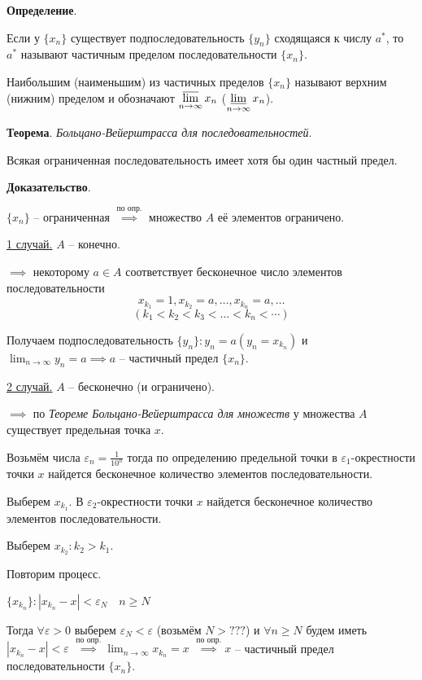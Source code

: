 \documentclass{article}
\newcommand{\bydef}{\stackrel{\text{по опр.}}{\implies}} %
\newcommand{\parspace}{\vspace{10pt}}
\begin{document}
\pagebreak

\textbf{Определение}.

Если у $\{x_n\}$ существует подпоследовательность $\{y_n\}$ сходящаяся к числу $a^*$,
то $a^*$ называют частичным пределом последовательности $\{x_n\}$.

Наибольшим (наименьшим) из частичных пределов $\{x_n\}$ называют верхним (нижним) пределом
и обозначают $\displaystyle\varlimsup_{n \to \infty} x_n$
($\displaystyle\varliminf_{n \to \infty} x_n$).

\parspace

\textbf{Теорема}. \textit{Больцано-Вейерштрасса для последовательностей}.

Всякая ограниченная последовательность имеет хотя бы один частный предел.

\textbf{Доказательство}.

$\{x_n\}$ -- ограниченная $\bydef$ множество $A$ её
элементов ограничено.

\underline{1 случай.} $A$ -- конечно.

$\implies$ некоторому $a \in A$ соответствует бесконечное число элементов последовательности 
\[x_{k_1} = 1, x_{k_2} = a, \dots, x_{k_n} = a, \dots\]
\[(k_1 < k_2 < k_3 < \dots < k_n < \cdots)\]

Получаем подпоследовательность $\{y_n\}: y_n = a (y_n = x_{k_n})$ и
$\displaystyle\lim_{n \to \infty} y_n = a \implies a$ -- частичный предел $\{x_n\}$.

\underline{2 случай.} $A$ -- бесконечно (и ограничено).

$\implies$ по \textit{Теореме Больцано-Вейерштрасса для множеств} у множества $A$
существует предельная точка $x$.

Возьмём числа $\varepsilon_n = \frac{1}{10^n}$ тогда по определению предельной точки
в $\varepsilon_1$-окрестности точки $x$ найдется бесконечное количество элементов последовательности.

Выберем $x_{k_1}$. В $\varepsilon_2$-окрестности точки $x$ найдется бесконечное
количество элементов последовательности.

Выберем $x_{k_2}: k_2 > k_1$.

Повторим процесс.

$\{x_{k_n}\}: \left| x_{k_n} - x \right| < \varepsilon_N \quad n \ge N$

Тогда $\forall \varepsilon > 0$ выберем $\varepsilon_N < \varepsilon$
(возьмём $N > ???$) и $\forall n \ge N$ будем иметь 
$\left| x_{k_n} - x \right| < \varepsilon$ 
$\bydef \displaystyle\lim_{n \to \infty} x_{k_n} = x$
$\bydef x$ -- частичный предел последовательности $\{x_n\}$.
\end{document}
